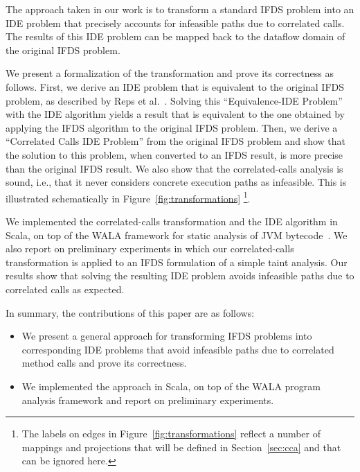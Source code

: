 

The approach taken in our work is to transform a standard IFDS problem into an
IDE problem that precisely accounts for infeasible paths due to correlated calls. 
The results of this IDE problem can be mapped back to the dataflow domain of the 
original IFDS problem.

We present a formalization of the transformation and prove its correctness
as follows. 
First, we derive an IDE problem that is equivalent to the original IFDS problem,
as described by Reps et al.~\cite{sagiv1996precise}.
Solving this ``Equivalence-IDE Problem'' with the IDE algorithm yields a result that
is equivalent to the one obtained by applying the IFDS algorithm to the original IFDS problem.
Then, we derive a ``Correlated Calls 
IDE Problem'' from the original IFDS problem and show 
that the solution to this problem, when converted to an IFDS result, is more precise
than the original IFDS result.
We also show that the correlated-calls analysis is sound, i.e., that it never considers concrete execution paths as infeasible.
This is illustrated schematically
in Figure~\ref{fig:transformations}%
\footnote{ 
  The labels %
  on edges in 
  Figure~\ref{fig:transformations} reflect a number of mappings and projections 
  that will be defined in Section~\ref{sec:cca} and that can be ignored here.
}.

We implemented the correlated-calls transformation and the IDE algorithm in Scala,
on top of the WALA framework for static analysis of JVM bytecode~\cite{fink2012wala}.
We also report on preliminary experiments in which our correlated-calls transformation
is applied to an IFDS formulation of a simple taint analysis. Our results show that
solving the resulting IDE problem avoids infeasible paths due to correlated calls as
expected.

In summary, the contributions of this paper are as follows:
\begin{itemize}
  \item
    We present a general approach for transforming IFDS problems into corresponding
    IDE problems that avoid infeasible paths due to correlated method calls and
    prove its correctness. 
  \item
    We implemented the approach in Scala, on top of the WALA program analysis framework
    and report on preliminary experiments. 
\end{itemize}

